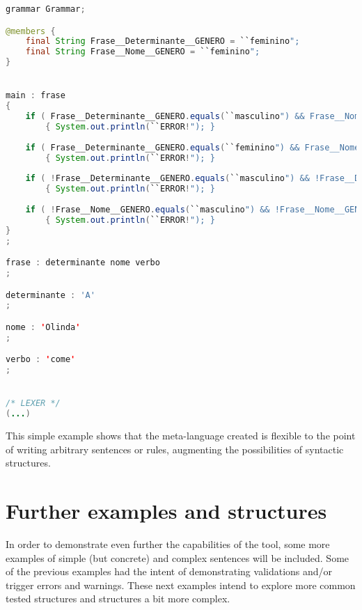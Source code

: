 \begin{center}
\begin{minipage}{15cm}
\begin{lstlisting}[language=java, basicstyle=\tiny, label={lst:case_study_sentence}, caption=Example of a specific generated grammar.]
grammar Grammar;

@members {
    final String Frase__Determinante__GENERO = ``feminino";
    final String Frase__Nome__GENERO = ``feminino";
}


main : frase
{
    if ( Frase__Determinante__GENERO.equals(``masculino") && Frase__Nome__GENERO.equals(``feminino") ) 
        { System.out.println(``ERROR!"); }
	
    if ( Frase__Determinante__GENERO.equals(``feminino") && Frase__Nome__GENERO.equals(``masculino") ) 
        { System.out.println(``ERROR!"); }
	
    if ( !Frase__Determinante__GENERO.equals(``masculino") && !Frase__Determinante__GENERO.equals(``feminino") ) 
        { System.out.println(``ERROR!"); }
	
    if ( !Frase__Nome__GENERO.equals(``masculino") && !Frase__Nome__GENERO.equals(``feminino") ) 
        { System.out.println(``ERROR!"); }
}
;

frase : determinante nome verbo 
;

determinante : 'A'
;

nome : 'Olinda'
;

verbo : 'come'
;


/* LEXER */
(...)
\end{lstlisting}
\end{minipage}
\end{center}


This simple example shows that the meta-language created is flexible to the point of writing arbitrary sentences or rules, 
augmenting the possibilities of syntactic structures.

\section{Further examples and structures}

In order to demonstrate even further the capabilities of the tool, some more examples of simple (but concrete) and complex sentences will be included.
Some of the previous examples had the intent of demonstrating validations and/or trigger errors and warnings.
These next examples intend to explore more common tested structures and structures a bit more complex.

